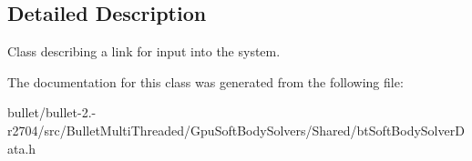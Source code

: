 \subsection{Detailed Description}
Class describing a link for input into the system. 

The documentation for this class was generated from the following file\+:\begin{DoxyCompactItemize}
\item 
bullet/bullet-\/2.-\/r2704/src/\+Bullet\+Multi\+Threaded/\+Gpu\+Soft\+Body\+Solvers/\+Shared/bt\+Soft\+Body\+Solver\+Data.\+h\end{DoxyCompactItemize}
